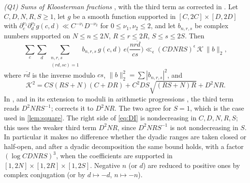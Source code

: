 \documentclass[11pt,colorlinks]{charlie}
\begin{document}
\emph{(Q1) Sums of Kloosterman fractions} \cite[Theorem~12]{DI}, with the third term as corrected in \cite[Lemma~7.5]{Lichtman}. Let $C,D,N,R,S\ge1$, let $g$ be a smooth function supported in $[C,2C]\times[D,2D]$ with $\partial_c^{\nu_1}\partial_d^{\nu_2}g(c,d)\ll C^{-\nu_1}D^{-\nu_2}$ for $0\le\nu_1,\nu_2\le2$, and let $b_{n,r,s}$ be complex numbers supported on $N\le n\le2N$, $R\le r\le2R$, $S\le s\le2S$. Then
\begin{equation}\label{eq:DI}
 \sum_c\sum_d\sum_{\substack{n,r,s\\(rd,sc)=1}}b_{n,r,s}\,g(c,d)\,e\Big(\frac{n\overline{rd}}{cs}\Big)\ll_\epsilon(CDNRS)^\epsilon\,\mathcal K\,\|b\|_2,
\end{equation}
where $\overline{rd}$ is the inverse modulo $cs$, $\|b\|_2^2=\sum|b_{n,r,s}|^2$, and
\begin{equation}\label{eq:DIK}
 \mathcal K^2=CS(RS+N)(C+DR)+C^2DS\sqrt{(RS+N)R}+D^2NR .
\end{equation}
In \cite[Theorem~12]{DI}, and in its extension to moduli in arithmetic progressions \cite[Theorem~2.1]{Drappeau}, the third term reads $D^2NRS^{-1}$; \cite[Lemma~7.5]{Lichtman} corrects it to $D^2NR$. The two agree for $S=1$, which is the case used in \cref{lem:square}. The right side of \eqref{eq:DI} is nondecreasing in $C,D,N,R,S$; this uses the weaker third term $D^2NR$, since $D^2NRS^{-1}$ is not nondecreasing in $S$. In particular it makes no difference whether the dyadic ranges are taken closed or half-open, and after a dyadic decomposition the same bound holds, with a factor $(\log CDNRS)^3$, when the coefficients are supported in $[1,2N]\times[1,2R]\times[1,2S]$. Negative $n$ (or $d$) are reduced to positive ones by complex conjugation (or by $d\mapsto-d$, $n\mapsto-n$).
\end{document}
